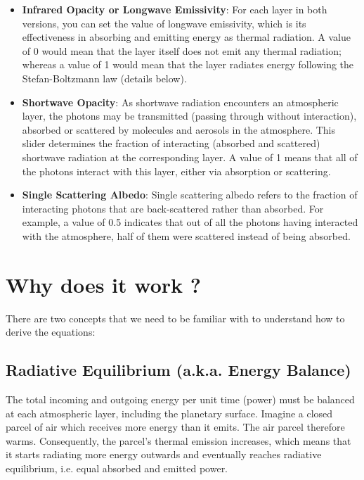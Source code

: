 \documentclass[a4paper,12pt]{article}
\begin{document}
\begin{itemize}
    \item \textbf{Infrared Opacity or Longwave Emissivity}: For each layer in both versions, you can set the value of longwave emissivity, which is its effectiveness in absorbing and emitting energy as thermal radiation. A value of 0 would mean that the layer itself does not emit any thermal radiation; whereas a value of 1 would mean that the layer radiates energy following the Stefan-Boltzmann law (details below).
    
    \item \textbf{Shortwave Opacity}: As shortwave radiation encounters an atmospheric layer, the photons may be transmitted (passing through without interaction), absorbed or scattered by molecules and aerosols in the atmosphere. This slider determines the fraction of interacting (absorbed and scattered) shortwave radiation at the corresponding layer. A value of 1 means that all of the photons interact with this layer, either via absorption or scattering. 
    
    \item \textbf{Single Scattering Albedo}: Single scattering albedo refers to the fraction of interacting photons that are back-scattered rather than absorbed. For example, a value of 0.5 indicates that out of all the photons having interacted with the atmosphere, half of them were scattered instead of being absorbed.
    
\end{itemize}



\section*{Why does it work ?}

There are two concepts that we need to be familiar with to understand how to derive the equations:

\subsection*{Radiative Equilibrium (a.k.a. Energy Balance)}

The total incoming and outgoing energy per unit time (power) must be balanced at each atmospheric layer, including the planetary surface. Imagine a closed parcel of air which receives more energy than it emits. The air parcel therefore warms. Consequently, the parcel's thermal emission increases, which means that it starts radiating more energy outwards and eventually reaches radiative equilibrium, i.e. equal absorbed and emitted power.
\end{document}
